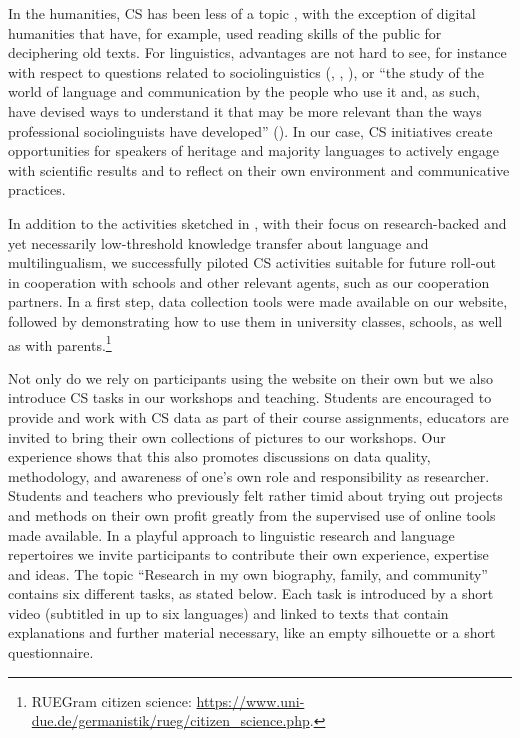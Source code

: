 \documentclass[output=paper,colorlinks,citecolor=brown]{langscibook}
\begin{document}
In the humanities, CS has been less of a topic \citep{Shirk&Bonney2018}, with the exception of digital humanities that have, for example, used reading skills of the public for deciphering old texts. For linguistics, advantages are not hard to see, for instance with respect to questions related to sociolinguistics (\cite{Rymes&Leone2014}, \cite{Svendsen2018}, \cite{Rymes2020}), or “the study of the world of language and communication by the people who use it and, as such, have devised ways to understand it that may be more relevant than the ways professional sociolinguists have developed” (\cite[5]{Rymes2020}). In our case, CS initiatives create opportunities for speakers of heritage and majority languages to actively engage with scientific results and to reflect on their own environment and communicative practices.

In addition to the activities sketched in , with their focus on research\hyp backed and yet necessarily low-threshold knowledge transfer about language and multilingualism, we successfully piloted CS activities suitable for future roll-out in cooperation with schools and other relevant agents, such as our cooperation partners. In a first step, data collection tools were made available on our website, followed by demonstrating how to use them in university classes, schools, as well as with parents.\footnote{RUEGram citizen science: \url{https://www.uni-due.de/germanistik/rueg/citizen_science.php}.}

Not only do we rely on participants using the website on their own but we also introduce CS tasks in our workshops and teaching. Students are encouraged to provide and work with CS data as part of their course assignments, educators are invited to bring their own collections of pictures to our workshops. Our experience shows that this also promotes discussions on data quality, methodology, and awareness of one’s own role and responsibility as researcher.  Students and teachers who previously felt rather timid about trying out projects and methods on their own profit greatly from the supervised use of online tools made available.
In a playful approach to linguistic research and language repertoires we invite participants to contribute their own experience, expertise and ideas. The topic ``Research in my own biography, family, and community'' contains six different tasks, as stated below. Each task is introduced by a short video (subtitled in up to six languages) and linked to texts that contain explanations and further material necessary, like an empty silhouette or a short questionnaire.
\end{document}
